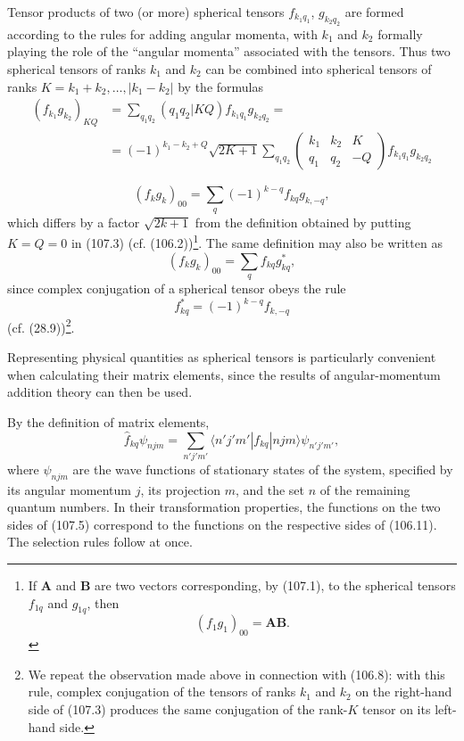 Tensor products of two (or more) spherical tensors $f_{k_1q_1}$, $g_{k_2q_2}$ are formed according to the rules for adding angular momenta, with $k_1$ and $k_2$ formally playing the role of the ``angular momenta'' associated with the tensors. Thus two spherical tensors of ranks $k_1$ and $k_2$ can be combined into spherical tensors of ranks $K=k_1+k_2,\ldots,|k_1-k_2|$ by the formulas
\begin{equation}
 \begin{aligned}
 (f_{k_1}g_{k_2})_{KQ}&=\sum_{q_1q_2}(q_1q_2|KQ)f_{k_1q_1}g_{k_2q_2}=\\
 &=(-1)^{k_1-k_2+Q}\sqrt{2K+1}\sum_{q_1q_2}
 \begin{pmatrix}k_1&k_2&K\\q_1&q_2&-Q\end{pmatrix}f_{k_1q_1}g_{k_2q_2}
 \end{aligned}
 \tag{107.3}
\end{equation}

\begin{equation}
 (f_kg_k)_{00}=\sum_q(-1)^{k-q}f_{kq}g_{k,-q},
 \tag{107.4}
\end{equation}
which differs by a factor $\sqrt{2k+1}$ from the definition obtained by putting $K=Q=0$ in (107.3) (cf. (106.2))\footnote{If $\mathbf A$ and $\mathbf B$ are two vectors corresponding, by (107.1), to the spherical tensors $f_{1q}$ and $g_{1q}$, then
\[
 (f_1g_1)_{00}=\mathbf{AB}.
\]}. The same definition may also be written as
\[
 (f_kg_k)_{00}=\sum_q f_{kq}g_{kq}^{*},
\]
since complex conjugation of a spherical tensor obeys the rule
\[
 f_{kq}^{*}=(-1)^{k-q}f_{k,-q}
\]
(cf. (28.9))\footnote{We repeat the observation made above in connection with (106.8): with this rule, complex conjugation of the tensors of ranks $k_1$ and $k_2$ on the right-hand side of (107.3) produces the same conjugation of the rank-$K$ tensor on its left-hand side.}.

Representing physical quantities as spherical tensors is particularly convenient when calculating their matrix elements, since the results of angular-momentum addition theory can then be used.

By the definition of matrix elements,
\begin{equation}
 \widehat f_{kq}\psi_{njm}=\sum_{n'j'm'}\langle n'j'm'|f_{kq}|njm\rangle\psi_{n'j'm'},
 \tag{107.5}
\end{equation}
where $\psi_{njm}$ are the wave functions of stationary states of the system, specified by its angular momentum $j$, its projection $m$, and the set $n$ of the remaining quantum numbers. In their transformation properties, the functions on the two sides of (107.5) correspond to the functions on the respective sides of (106.11). The selection rules follow at once.

